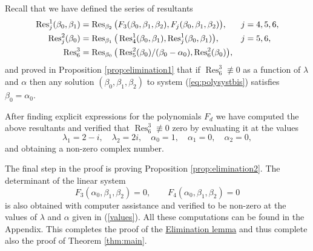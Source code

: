 Recall that we have defined the series of resultants
\begin{align*}
 \operatorname{Res}^1_j(\beta_0,\beta_1) &= \operatorname{Res}_{\beta_2}\big(F_3(\beta_0,\beta_1,\beta_2),F_j(\beta_0,\beta_1,\beta_2)\big), & j &= 4,5,6, \\
 \operatorname{Res}^2_j(\beta_0) &= \operatorname{Res}_{\beta_1}\big(\operatorname{Res}^1_4(\beta_0,\beta_1),\operatorname{Res}^1_j(\beta_0,\beta_1)\big), & j &= 5,6, \\
 \operatorname{Res}^3_6   &= \operatorname{Res}_{\beta_0}\big(\operatorname{Res}^2_5(\beta_0)/(\beta_0-\alpha_0),\operatorname{Res}^2_6(\beta_0)\big), & &
\end{align*}
and proved in Proposition \ref{prop:elimination1} that if $\operatorname{Res}_6^3\not\equiv0$ as a function of $\lambda$ and $\alpha$ then any solution $(\beta_0,\beta_1,\beta_2)$ to system (\ref{eq:polysystbis}) satisfies $\beta_0=\alpha_0$. 

After finding explicit expressions for the polynomials $F_d$ we have computed the above resultants and verified that $\operatorname{Res}_6^3\not\equiv0$ zero by evaluating it at the values
\begin{equation}\label{values}
  \lambda_1=2-i,\quad \lambda_2=2i,\quad \alpha_0=1,\quad \alpha_1=0,\quad \alpha_2=0,
\end{equation}
and obtaining a non-zero complex number.

The final step in the proof is proving Proposition \ref{prop:elimination2}. The determinant of the linear system 
\[ F_3(\alpha_0,\beta_1,\beta_2)=0,\qquad F_4(\alpha_0,\beta_1,\beta_2)=0 \] 
is also obtained with computer assistance and verified to be non-zero at the values of $\lambda$ and $\alpha$ given in (\ref{values}). All these computations can be found in the Appendix. %
This completes the proof of the \hyperref[lemma:elimination]{Elimination lemma} and thus complete also the proof of Theorem \ref{thm:main}.




































